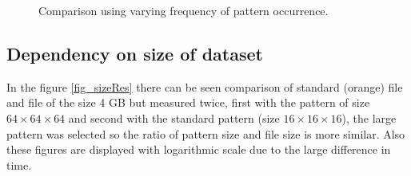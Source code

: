 \begin{figure}
\begin{minipage}{.5\linewidth}
\centering
{}
\end{minipage}%
\begin{minipage}{.5\linewidth}
\centering
{}
\end{minipage}\par\medskip

\caption{Comparison using varying frequency of pattern occurrence.}
\label{fig_patRes}
\end{figure}

\subsection{Dependency on size of dataset}
In the figure \ref{fig_sizeRes} there can be seen comparison of standard (orange) file and file of the size 4 GB but measured twice, first with the pattern of size $64\times64\times64$ and second with the standard pattern (size $16\times16\times16$), the large pattern was selected so the ratio of pattern size and file size is more similar. Also these figures are displayed with logarithmic scale due to the large difference in time. 

